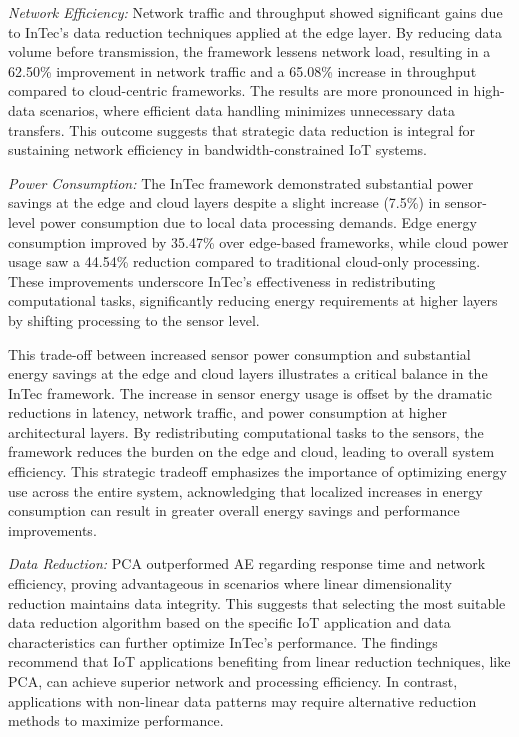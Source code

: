 \documentclass[11pt]{article}
\begin{document}
	\textit{Network Efficiency:} Network traffic and throughput showed significant gains due
	to InTec’s data reduction techniques applied at the edge layer. By reducing data volume before transmission, the framework lessens network load, resulting in a 62.50\%
	improvement in network traffic and a 65.08\% increase in throughput compared to
	cloud-centric frameworks. The results are more pronounced in high-data scenarios,
	where efficient data handling minimizes unnecessary data transfers. This outcome suggests that strategic data reduction is integral for sustaining network efficiency in
	bandwidth-constrained IoT systems.
	
	
	
	\textit{Power Consumption:} The InTec framework demonstrated substantial power savings at the edge and cloud layers despite a slight increase (7.5\%) in sensor-level
	power consumption due to local data processing demands. Edge energy consumption improved by 35.47\% over edge-based frameworks, while cloud power usage saw
	a 44.54\% reduction compared to traditional cloud-only processing. These improvements underscore InTec’s effectiveness in redistributing computational tasks, significantly reducing energy requirements at higher layers by shifting processing to the
	sensor level.
	
	This trade-off between increased sensor power consumption and substantial
	energy savings at the edge and cloud layers illustrates a critical balance in the InTec framework. The increase in sensor energy usage is offset by the dramatic reductions
	in latency, network traffic, and power consumption at higher architectural layers. By
	redistributing computational tasks to the sensors, the framework reduces the burden on the edge and cloud, leading to overall system efficiency. This strategic tradeoff emphasizes the importance of optimizing energy use across the entire system,
	acknowledging that localized increases in energy consumption can result in greater
	overall energy savings and performance improvements.
	
	\textit{Data Reduction:} PCA outperformed AE regarding response time and network
	efficiency, proving advantageous in scenarios where linear dimensionality reduction
	maintains data integrity. This suggests that selecting the most suitable data reduction algorithm based on the specific IoT application and data characteristics can further optimize InTec’s performance. The findings recommend that IoT applications
	benefiting from linear reduction techniques, like PCA, can achieve superior network
	and processing efficiency. In contrast, applications with non-linear data patterns may
	require alternative reduction methods to maximize performance.
	
\end{document}
